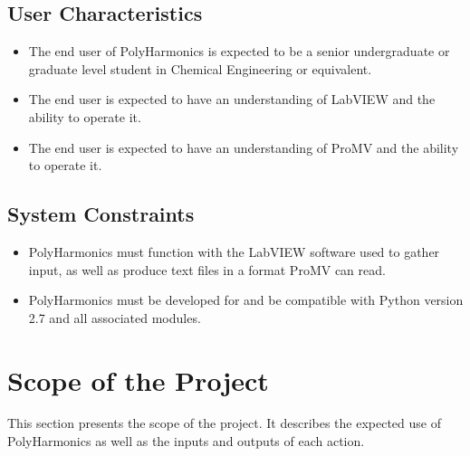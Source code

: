 \documentclass[12pt]{article}
\newcommand{\progname}{PolyHarmonics}
\begin{document}

\subsection{User Characteristics}
\begin{itemize}
\item The end user of \progname{} is expected to be a senior undergraduate or
 graduate level student in Chemical Engineering or equivalent.
 \item The end user is expected to have an understanding of LabVIEW and the 
ability to operate it.
 \item The end user is expected to have an understanding of ProMV and the 
ability to operate it.
\end{itemize}
\subsection{System Constraints}

\begin{itemize}
\item \progname{} must function with the LabVIEW \cite{TDMS} software used to 
gather input,
  as well as produce text files in a format ProMV \cite{ProMV} can read.  
\item \progname{} must be developed for and be compatible with Python version
  2.7 and all associated modules.
\end{itemize}


\section{Scope of the Project}

This section presents the scope of the project. It describes the expected use of
\progname{} as well as the inputs and outputs of each action.
\end{document}
